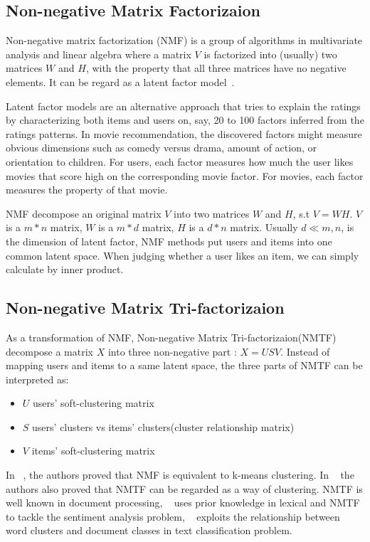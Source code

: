 \hspace{0.05in}
\subsection{Non-negative Matrix Factorizaion}
Non-negative matrix factorization (NMF) is a group of algorithms in multivariate analysis and linear algebra where a matrix $V$ is factorized into (usually) two matrices $W$ and $H$, with the property that all three matrices have no negative elements. It can be regard as a latent factor model~\cite{/computer/yehuda09matrix}.

Latent factor models are an alternative approach that tries to explain the ratings by characterizing both items and users on, say, 20 to 100 factors inferred from the ratings patterns. In movie recommendation, the discovered factors might measure obvious dimensions such as comedy versus
drama, amount of action, or orientation to children. For users, each factor measures how much the user likes movies that score high on the corresponding movie factor. For movies, each factor measures the property of that movie.

NMF decompose an original matrix $V$ into two matrices $W$ and $H$, s.t $V = WH$. $V$ is a $m*n$ matrix, $W$ is a $m*d$ matrix, $H$ is a $d*n$ matrix. Usually $d \ll m,n$, is the dimension of latent factor, NMF methods put users and items into one common latent space. When judging whether a user likes an item, we can simply calculate by inner product.

\hspace{0.05in}
\subsection{Non-negative Matrix Tri-factorizaion}
As a transformation of NMF, Non-negative Matrix Tri-factorizaion(NMTF) decompose a matrix $X$ into three non-negative part : $X = USV$. Instead of mapping users and items to a same latent space, the three parts of NMTF can be interpreted as:
\begin{itemize}
\item $U$ users' soft-clustering matrix
\item $S$ users' clusters vs items' clusters(cluster relationship matrix)
\item $V$ items' soft-clustering matrix
\end{itemize}

In ~\cite{Ding05onthe}, the authors proved that NMF is equivalent to k-means clustering. In ~\cite{Ding06orthogonalnonnegative} the authors also proved that NMTF can be regarded as a way of clustering. NMTF is well known in document processing, ~\cite{Li:2009:NMT:1687878.1687914} uses prior knowledge in lexical and NMTF to tackle the sentiment analysis problem, ~\cite{Zhuang:2011:EAW:1952191.1952195} exploits the relationship between word clusters and document classes in text classification problem.

